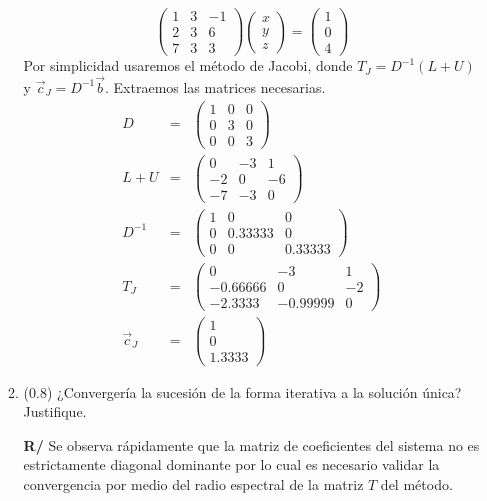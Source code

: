 \documentclass[12pt]{article}
\begin{document}
\begin{enumerate}[leftmargin=*,widest=9]
\begin{enumerate}[label=\alph*]
    \[ 
    \begin{pmatrix}
    1 & 3 & -1\\
    2 & 3 & 6 \\
    7 & 3 & 3
    \end{pmatrix} \begin{pmatrix}
    x\\ y\\ z
    \end{pmatrix} = \begin{pmatrix}
    1\\ 0\\ 4
    \end{pmatrix}
    \]
Por simplicidad usaremos el método de Jacobi, donde \(T_J = D^{-1}(L+U)\) y \(\vec{c}_J = D^{-1}\vec{b}\).
Extraemos las matrices necesarias.
\begin{eqnarray*}
D &=& \begin{pmatrix}
1 & 0 & 0\\
0 & 3 & 0\\
0 & 0 & 3
\end{pmatrix} \\
L+U &=& \begin{pmatrix}
0 & -3 & 1\\
-2 & 0 & -6\\
-7 & -3 & 0
\end{pmatrix} \\
D^{-1} &=& \begin{pmatrix}
1 & 0 & 0\\
0 & 0.33333 & 0\\
0 & 0 & 0.33333
\end{pmatrix}\\
T_J &=& \begin{pmatrix}
0 & -3 & 1\\
-0.66666 & 0 & -2\\
-2.3333 & -0.99999 & 0
\end{pmatrix}\\
\vec{c}_J &=& \begin{pmatrix}
1\\0\\1.3333
\end{pmatrix}
\end{eqnarray*}
    \item (\(0.8\)) ¿Convergería la sucesión de la forma iterativa a la solución única? Justifique.
    
    \textbf{R/} Se observa rápidamente que la matriz de coeficientes del sistema no es estrictamente diagonal dominante por lo cual es necesario validar la convergencia por medio del radio espectral de la matriz \(T\) del método.
    

\end{enumerate}
\end{enumerate}
\end{document}
